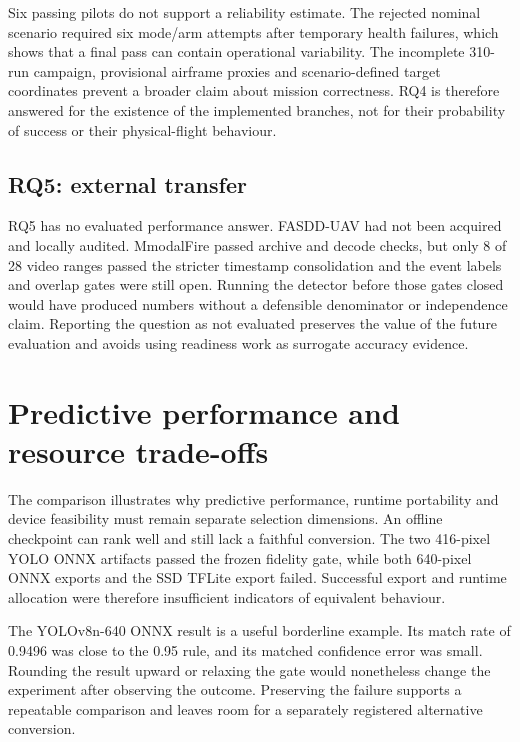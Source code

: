 Six passing pilots do not support a reliability estimate. The rejected nominal
scenario required six mode/arm attempts after temporary health failures, which
shows that a final pass can contain operational variability. The incomplete
310-run campaign, provisional airframe proxies and scenario-defined target
coordinates prevent a broader claim about mission correctness. RQ4 is therefore
answered for the existence of the implemented branches, not for their
probability of success or their physical-flight behaviour.

\subsection*{RQ5: external transfer}

RQ5 has no evaluated performance answer. FASDD-UAV had not been acquired and locally
audited. MmodalFire passed archive and decode checks, but only 8 of 28 video
ranges passed the stricter timestamp consolidation and the event labels and
overlap gates were still open. Running the detector before those gates closed
would have produced numbers without a defensible denominator or independence
claim. Reporting the question as not evaluated preserves the value of the future
evaluation and avoids using readiness work as surrogate accuracy evidence.

\section{Predictive performance and resource trade-offs}
\label{sec:discussion:2}

The comparison illustrates why predictive performance, runtime portability and
device feasibility must remain separate selection dimensions. An offline
checkpoint can rank well and still lack a faithful conversion. The two
416-pixel YOLO ONNX artifacts passed the frozen fidelity gate, while both
640-pixel ONNX exports and the SSD TFLite export failed. Successful export and
runtime allocation were therefore insufficient indicators of equivalent
behaviour.

The YOLOv8n-640 ONNX result is a useful borderline example. Its match rate of
0.9496 was close to the 0.95 rule, and its matched confidence error was small.
Rounding the result upward or relaxing the gate would nonetheless change the
experiment after observing the outcome. Preserving the failure supports a
repeatable comparison and leaves room for a separately registered alternative
conversion.

